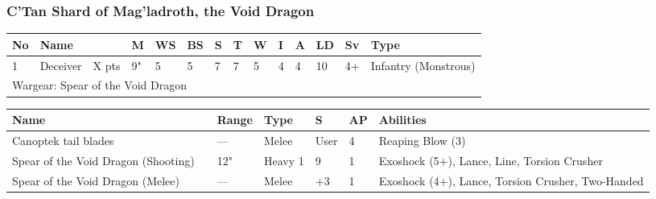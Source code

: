 \newpage
\subsubsection{C'Tan Shard of Mag'ladroth, the Void Dragon}

\noindent
\begin{tabular}{||m{10pt} m{95pt} m{30pt} m{11pt} m{11pt} m{11pt} m{11pt} m{11pt} m{11pt} m{11pt} m{11pt} m{11pt} m{11pt} m{125pt}||}
\hline
No & Name & & M & WS & BS & S & T & W & I & A & LD & Sv & Type \\
\hline
1 & Deceiver & X pts & 9" & 5 & 5 & 7 & 7 & 5 & 4 & 4 & 10 & 4+ & Infantry (Monstrous)\\
\hline
\hline
\multicolumn{14}{||Z{532 pt}||}{Wargear: Spear of the Void Dragon}\\
\hline
\end{tabular}

\noindent
\begin{tabular}{||m{140pt} m{0pt} m{31pt} m{55pt} m{12pt} m{12pt} m{210pt}||}
\hline
Name & & Range & Type & S & AP & Abilities \\
\hline
Canoptek tail blades & & — & Melee & User & 4 & Reaping Blow (3) \\
Spear of the Void Dragon (Shooting) &  & 12" & Heavy 1 & 9 & 1 & Exoshock (5+), Lance, Line, Torsion Crusher \\
Spear of the Void Dragon (Melee) &  & — & Melee & +3 & 1 & Exoshock (4+), Lance, Torsion Crusher, Two-Handed \\
\hline
\end{tabular}

